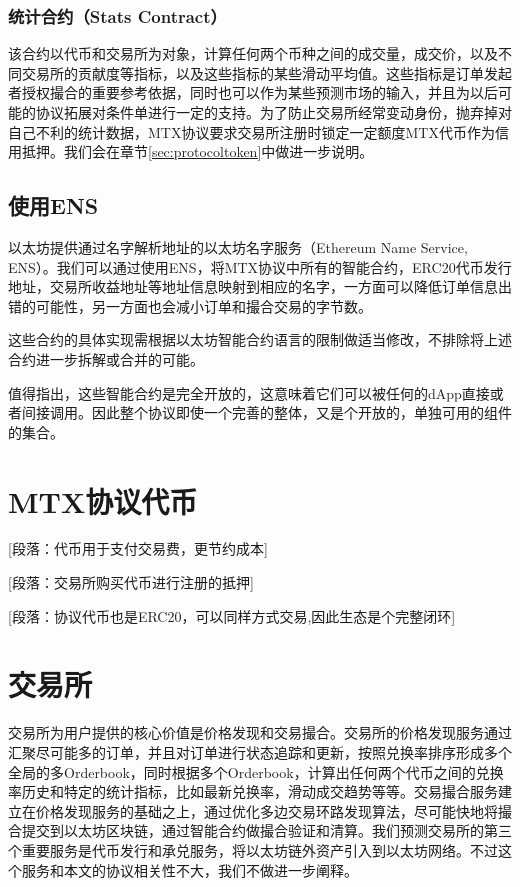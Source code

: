 \documentclass[UTF8,nofonts]{ctexart}
\begin{document}
\subsubsection{统计合约（Stats Contract）} 该合约以代币和交易所为对象，计算任何两个币种之间的成交量，成交价，以及不同交易所的贡献度等指标，以及这些指标的某些滑动平均值。这些指标是订单发起者授权撮合的重要参考依据，同时也可以作为某些预测市场的输入，并且为以后可能的协议拓展对条件单进行一定的支持。为了防止交易所经常变动身份，抛弃掉对自己不利的统计数据，MTX协议要求交易所注册时锁定一定额度MTX代币作为信用抵押。我们会在章节\ref{sec:protocoltoken}中做进一步说明。

\subsection{使用ENS\label{sec:registration}}

以太坊提供通过名字解析地址的以太坊名字服务（Ethereum Name Service, ENS）\cite{hirai2016formal}。我们可以通过使用ENS，将MTX协议中所有的智能合约，ERC20代币发行地址，交易所收益地址等地址信息映射到相应的名字，一方面可以降低订单信息出错的可能性，另一方面也会减小订单和撮合交易的字节数。


这些合约的具体实现需根据以太坊智能合约语言的限制做适当修改，不排除将上述合约进一步拆解或合并的可能。

值得指出，这些智能合约是完全开放的，这意味着它们可以被任何的dApp直接或者间接调用。因此整个协议即使一个完善的整体，又是个开放的，单独可用的组件的集合。

\section{MTX协议代币\label{sec:protocoltoken}}



[段落：代币用于支付交易费，更节约成本]

[段落：交易所购买代币进行注册的抵押]

[段落：协议代币也是ERC20，可以同样方式交易,因此生态是个完整闭环]


\section{交易所\label{sec:exchange}}

交易所为用户提供的核心价值是价格发现和交易撮合。交易所的价格发现服务通过汇聚尽可能多的订单，并且对订单进行状态追踪和更新，按照兑换率排序形成多个全局的多Orderbook，同时根据多个Orderbook，计算出任何两个代币之间的兑换率历史和特定的统计指标，比如最新兑换率，滑动成交趋势等等。交易撮合服务建立在价格发现服务的基础之上，通过优化多边交易环路发现算法，尽可能快地将撮合提交到以太坊区块链，通过智能合约做撮合验证和清算。我们预测交易所的第三个重要服务是代币发行和承兑服务，将以太坊链外资产引入到以太坊网络。不过这个服务和本文的协议相关性不大，我们不做进一步阐释。
\end{document}
